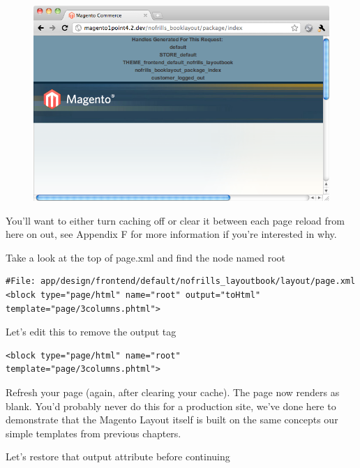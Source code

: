 \documentclass[oneside]{book}
\begin{document}
\begin{figure}[htb]
\begin{center}
\leavevmode
\includegraphics[width=1\textwidth]{images/chapter3/blank-theme.png}
\end{center}
\caption{}
\end{figure}


You'll want to either turn caching off or clear it between each page reload from here on out, see Appendix F for more information if you're interested in why.

Take a look at the top of page.xml and find the node named root

\begin{lstlisting}
#File: app/design/frontend/default/nofrills_layoutbook/layout/page.xml
<block type="page/html" name="root" output="toHtml"
template="page/3columns.phtml">

\end{lstlisting}


Let's edit this to remove the output tag

\begin{lstlisting}
<block type="page/html" name="root"
template="page/3columns.phtml">

\end{lstlisting}


Refresh your page (again, after clearing your cache).  The page now renders as blank.  You'd probably never do this for a production site, we've done here to demonstrate that the Magento Layout itself is built on the same concepts our simple templates from previous chapters.

Let's restore that output attribute before continuing
\end{document}
